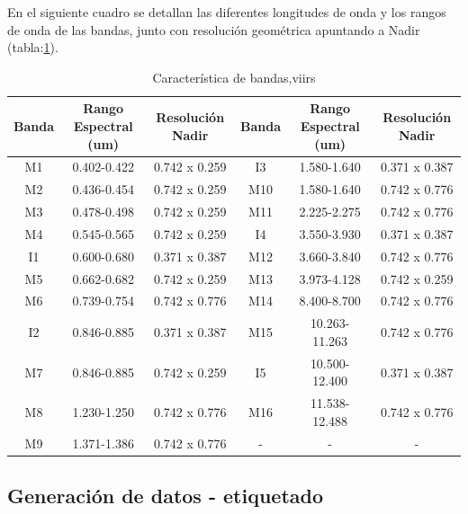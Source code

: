 En el siguiente cuadro se detallan las diferentes longitudes de onda y los rangos de onda de las bandas, junto con resolución geométrica apuntando a Nadir (tabla:\ref{tab:viirs}).
\begin{table}[H]
\begin{center}
\begin{tabular}{|c|c|c||c|c|c|}
\hline \textbf{Banda} & Rango Espectral (um) & Resolución Nadir & \textbf{Banda} & Rango Espectral (um) & Resolución Nadir \\\hline 
 		M1  & 0.402-0.422   & 0.742 x 0.259 & I3  & 1.580-1.640   & 0.371 x 0.387 \\ \hline 
		M2  & 0.436-0.454   & 0.742 x 0.259 & M10 & 1.580-1.640   & 0.742 x 0.776 \\ \hline 
		M3  & 0.478-0.498   & 0.742 x 0.259 & M11 & 2.225-2.275   & 0.742 x 0.776 \\ \hline 
		M4  & 0.545-0.565   & 0.742 x 0.259 & I4  & 3.550-3.930   & 0.371 x 0.387 \\ \hline 
		I1  & 0.600-0.680   & 0.371 x 0.387 & M12 & 3.660-3.840   & 0.742 x 0.776 \\ \hline 
		M5  & 0.662-0.682   & 0.742 x 0.259 & M13 & 3.973-4.128   & 0.742 x 0.259 \\ \hline 
		M6  & 0.739-0.754   & 0.742 x 0.776 & M14 & 8.400-8.700   & 0.742 x 0.776 \\ \hline 
		I2  & 0.846-0.885   & 0.371 x 0.387 & M15 & 10.263-11.263 & 0.742 x 0.776 \\ \hline 
		M7  & 0.846-0.885   & 0.742 x 0.259 & I5  & 10.500-12.400 & 0.371 x 0.387 \\ \hline 
		M8  & 1.230-1.250   & 0.742 x 0.776 & M16 & 11.538-12.488 & 0.742 x 0.776 \\ \hline 
		M9  & 1.371-1.386   & 0.742 x 0.776 & - &-&- \\ \hline 
\end{tabular}
\end{center}\caption{Característica de bandas,\ac{viirs} \label{tab:viirs}}
\end{table}

\subsection{Generación de datos - etiquetado}\label{sub:generacion_datos_etiquetado}

